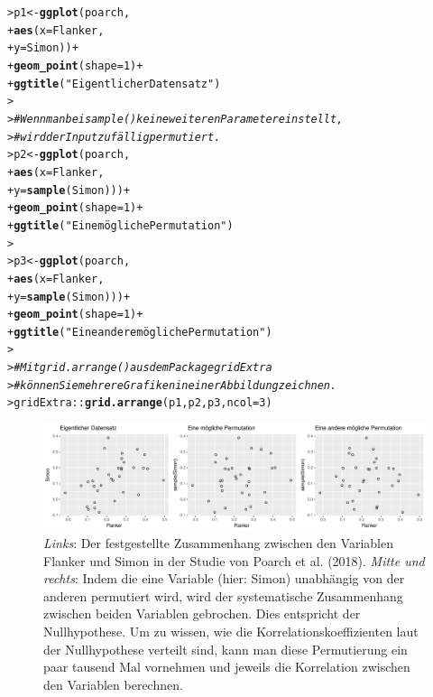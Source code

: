 \documentclass[oneside, 10pt]{book}\usepackage[]{graphicx}\usepackage[]{xcolor}
\makeatletter
\newcommand{\hlnum}[1]{\textcolor[rgb]{0.686,0.059,0.569}{#1}}%
\newcommand{\hlstr}[1]{\textcolor[rgb]{0.192,0.494,0.8}{#1}}%
\newcommand{\hlcom}[1]{\textcolor[rgb]{0.678,0.584,0.686}{\textit{#1}}}%
\newcommand{\hlopt}[1]{\textcolor[rgb]{0,0,0}{#1}}%
\newcommand{\hlstd}[1]{\textcolor[rgb]{0.345,0.345,0.345}{#1}}%
\newcommand{\hlkwb}[1]{\textcolor[rgb]{0.69,0.353,0.396}{#1}}%
\newcommand{\hlkwc}[1]{\textcolor[rgb]{0.333,0.667,0.333}{#1}}%
\newcommand{\hlkwd}[1]{\textcolor[rgb]{0.737,0.353,0.396}{\textbf{#1}}}%
\newenvironment{kframe}{%
 \def\at@end@of@kframe{}%
 \ifinner\ifhmode%
  \def\at@end@of@kframe{\end{minipage}}%
  \begin{minipage}{\columnwidth}%
 \fi\fi%
 \def\FrameCommand##1{\hskip\@totalleftmargin \hskip-\fboxsep
 \colorbox{shadecolor}{##1}\hskip-\fboxsep
     \hskip-\linewidth \hskip-\@totalleftmargin \hskip\columnwidth}%
 \MakeFramed {\advance\hsize-\width
   \@totalleftmargin\z@ \linewidth\hsize
   \@setminipage}}%
 {\par\unskip\endMakeFramed%
 \at@end@of@kframe}
\newenvironment{knitrout}{}{} %
\makeatother
\begin{document}
\begin{knitrout}
\color{fgcolor}\begin{kframe}
\begin{alltt}
\hlstd{> }\hlstd{p1} \hlkwb{<-} \hlkwd{ggplot}\hlstd{(poarch,}
\hlstd{+ }             \hlkwd{aes}\hlstd{(}\hlkwc{x} \hlstd{= Flanker,}
\hlstd{+ }                 \hlkwc{y} \hlstd{= Simon))} \hlopt{+}
\hlstd{+ }  \hlkwd{geom_point}\hlstd{(}\hlkwc{shape} \hlstd{=} \hlnum{1}\hlstd{)} \hlopt{+}
\hlstd{+ }  \hlkwd{ggtitle}\hlstd{(}\hlstr{"Eigentlicher Datensatz"}\hlstd{)}
\hlstd{> }
\hlstd{> }\hlcom{# Wenn man bei sample() keine weiteren Parameter einstellt,}
\hlstd{> }\hlcom{# wird der Input zufällig permutiert.}
\hlstd{> }\hlstd{p2} \hlkwb{<-} \hlkwd{ggplot}\hlstd{(poarch,}
\hlstd{+ }             \hlkwd{aes}\hlstd{(}\hlkwc{x} \hlstd{= Flanker,}
\hlstd{+ }                 \hlkwc{y} \hlstd{=} \hlkwd{sample}\hlstd{(Simon)))} \hlopt{+}
\hlstd{+ }  \hlkwd{geom_point}\hlstd{(}\hlkwc{shape} \hlstd{=} \hlnum{1}\hlstd{)} \hlopt{+}
\hlstd{+ }  \hlkwd{ggtitle}\hlstd{(}\hlstr{"Eine mögliche Permutation"}\hlstd{)}
\hlstd{> }
\hlstd{> }\hlstd{p3} \hlkwb{<-} \hlkwd{ggplot}\hlstd{(poarch,}
\hlstd{+ }             \hlkwd{aes}\hlstd{(}\hlkwc{x} \hlstd{= Flanker,}
\hlstd{+ }                 \hlkwc{y} \hlstd{=} \hlkwd{sample}\hlstd{(Simon)))} \hlopt{+}
\hlstd{+ }  \hlkwd{geom_point}\hlstd{(}\hlkwc{shape} \hlstd{=} \hlnum{1}\hlstd{)} \hlopt{+}
\hlstd{+ }  \hlkwd{ggtitle}\hlstd{(}\hlstr{"Eine andere mögliche Permutation"}\hlstd{)}
\hlstd{> }
\hlstd{> }\hlcom{# Mit grid.arrange() aus dem Package gridExtra}
\hlstd{> }\hlcom{# können Sie mehrere Grafiken in einer Abbildung zeichnen.}
\hlstd{> }\hlstd{gridExtra}\hlopt{::}\hlkwd{grid.arrange}\hlstd{(p1, p2, p3,} \hlkwc{ncol} \hlstd{=} \hlnum{3}\hlstd{)}
\end{alltt}
\end{kframe}\begin{figure}[tp]

{\centering \includegraphics[width=\textwidth]{figs/unnamed-chunk-353-1} 

}

\caption{\textit{Links}: Der festgestellte Zusammenhang zwischen den Variablen Flanker und Simon in der Studie von Poarch et al. (2018). \textit{Mitte und rechts}: Indem die eine Variable (hier: Simon) unabhängig von der anderen permutiert wird, wird der systematische Zusammenhang zwischen beiden Variablen gebrochen. Dies entspricht der Nullhypothese. Um zu wissen, wie die Korrelationskoeffizienten laut der Nullhypothese verteilt sind, kann man diese Permutierung ein paar tausend Mal vornehmen und jeweils die Korrelation zwischen den Variablen berechnen.\label{fig:permutationenkorrelation}}\label{fig:unnamed-chunk-353}
\end{figure}


\end{knitrout}
\end{document}
